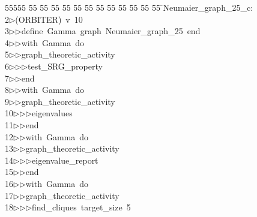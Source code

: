 %
%
\begin{tabbing}
55555 \= 55 \= 55 \= 55 \= 55 \= 55 \= 55 \= 55 \= 55 \= 55 \= 55 \= 55 \= 55 \= \>Neumaier\_graph\_25\_c:\\[0pt]
2\>$\triangleright$\>(ORBITER)\ v\ 10\ \\[0pt]
3\>$\triangleright$\>$\triangleright$\>define\ Gamma\ graph\ Neumaier\_graph\_25\ end\ \\[0pt]
4\>$\triangleright$\>$\triangleright$\>with\ Gamma\ do\ \\[0pt]
5\>$\triangleright$\>$\triangleright$\>graph\_theoretic\_activity\ \\[0pt]
6\>$\triangleright$\>$\triangleright$\>$\triangleright$\>test\_SRG\_property\ \\[0pt]
7\>$\triangleright$\>$\triangleright$\>end\ \\[0pt]
8\>$\triangleright$\>$\triangleright$\>with\ Gamma\ do\ \\[0pt]
9\>$\triangleright$\>$\triangleright$\>graph\_theoretic\_activity\ \\[0pt]
10\>$\triangleright$\>$\triangleright$\>$\triangleright$\>eigenvalues\ \\[0pt]
11\>$\triangleright$\>$\triangleright$\>end\ \\[0pt]
12\>$\triangleright$\>$\triangleright$\>with\ Gamma\ do\ \\[0pt]
13\>$\triangleright$\>$\triangleright$\>graph\_theoretic\_activity\ \\[0pt]
14\>$\triangleright$\>$\triangleright$\>$\triangleright$\>eigenvalue\_report\ \\[0pt]
15\>$\triangleright$\>$\triangleright$\>end\ \\[0pt]
16\>$\triangleright$\>$\triangleright$\>with\ Gamma\ do\ \\[0pt]
17\>$\triangleright$\>$\triangleright$\>graph\_theoretic\_activity\ \\[0pt]
18\>$\triangleright$\>$\triangleright$\>$\triangleright$\>find\_cliques\ target\_size\ 5\ \\[0pt]

\end{tabbing}
